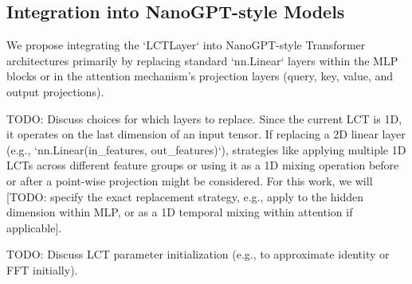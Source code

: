 \subsection{Integration into NanoGPT-style Models}
We propose integrating the `LCTLayer` into NanoGPT-style Transformer architectures primarily by replacing standard `nn.Linear` layers within the MLP blocks or in the attention mechanism's projection layers (query, key, value, and output projections).

TODO: Discuss choices for which layers to replace. Since the current LCT is 1D, it operates on the last dimension of an input tensor. If replacing a 2D linear layer (e.g., `nn.Linear(in_features, out_features)`), strategies like applying multiple 1D LCTs across different feature groups or using it as a 1D mixing operation before or after a point-wise projection might be considered. For this work, we will [TODO: specify the exact replacement strategy, e.g., apply to the hidden dimension within MLP, or as a 1D temporal mixing within attention if applicable].

TODO: Discuss LCT parameter initialization (e.g., to approximate identity or FFT initially).